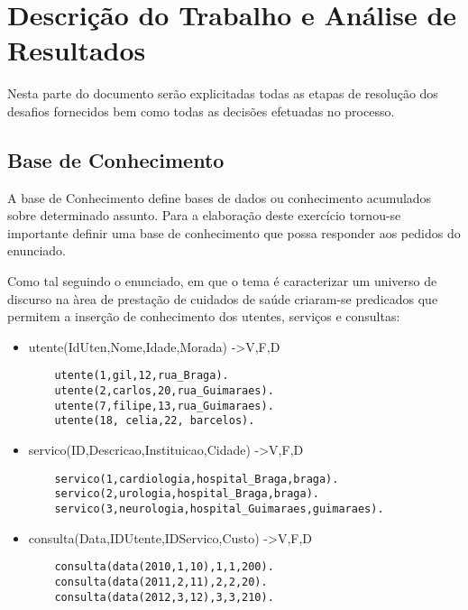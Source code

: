 \chapter{Descrição do Trabalho e Análise de Resultados}
\label{cap:p3}

Nesta parte do documento serão explicitadas todas as etapas de resolução dos desafios fornecidos bem como todas as decisões efetuadas no processo.


\section{Base de Conhecimento}
\label{p3:baseConhe}

A base de Conhecimento define bases de dados ou conhecimento acumulados sobre determinado assunto.
Para a elaboração deste exercício tornou-se importante definir uma base de conhecimento que possa responder aos pedidos do enunciado.

Como tal seguindo o enunciado, em que o tema é caracterizar um universo de discurso na àrea de prestação de cuidados de saúde criaram-se predicados que permitem a inserção de conhecimento dos utentes, serviços e consultas: 

\begin{itemize}
	\item utente(IdUten,Nome,Idade,Morada) ->{V,F,D}
	\begin{Verbatim}
	utente(1,gil,12,rua_Braga).
	utente(2,carlos,20,rua_Guimaraes).
	utente(7,filipe,13,rua_Guimaraes).
	utente(18, celia,22, barcelos). 
	\end{Verbatim}
	
	\item servico(ID,Descricao,Instituicao,Cidade) ->{V,F,D}
	
	\begin{Verbatim}
	servico(1,cardiologia,hospital_Braga,braga).
	servico(2,urologia,hospital_Braga,braga).
	servico(3,neurologia,hospital_Guimaraes,guimaraes). 

	\end{Verbatim}
	
	\item consulta(Data,IDUtente,IDServico,Custo) ->{V,F,D}
	
	\begin{Verbatim}
	consulta(data(2010,1,10),1,1,200).
	consulta(data(2011,2,11),2,2,20).
	consulta(data(2012,3,12),3,3,210).
	\end{Verbatim}
\end{itemize}


